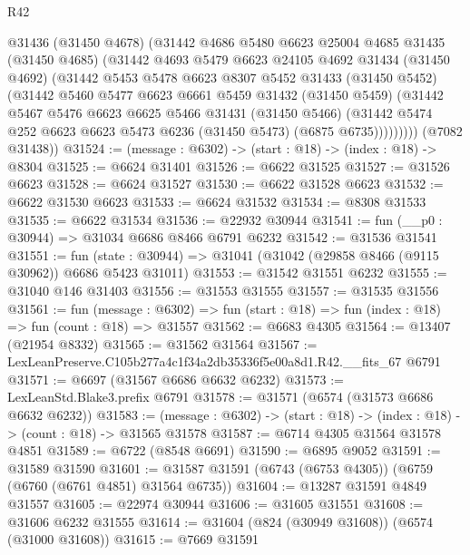 \begin{lexlean}{R42}
\begin{coremodule}
{          @31436
          (@31450 @4678)
          (@31442
            @4686
            @5480
            @6623
            @25004
            @4685
            @31435
            (@31450 @4685)
            (@31442
              @4693
              @5479
              @6623
              @24105
              @4692
              @31434
              (@31450 @4692)
              (@31442
                @5453
                @5478
                @6623
                @8307
                @5452
                @31433
                (@31450 @5452)
                (@31442
                  @5460
                  @5477
                  @6623
                  @6661
                  @5459
                  @31432
                  (@31450 @5459)
                  (@31442
                    @5467
                    @5476
                    @6623
                    @6625
                    @5466
                    @31431
                    (@31450 @5466)
                    (@31442 @5474 @252 @6623 @6623 @5473 @6236 (@31450 @5473) (@6875 @6735)))))))))
      (@7082 @31438))
@31524 := (message : @6302) -> (start : @18) -> (index : @18) -> @8304
@31525 := @6624 @31401
@31526 := @6622 @31525
@31527 := @31526 @6623
@31528 := @6624 @31527
@31530 := @6622 @31528 @6623
@31532 := @6622 @31530 @6623
@31533 := @6624 @31532
@31534 := @8308 @31533
@31535 := @6622 @31534
@31536 := @22932 @30944
@31541 := fun (__p0 : @30944) => @31034 @6686 @8466 @6791 @6232
@31542 := @31536 @31541
@31551 := fun (state : @30944) => @31041 (@31042 (@29858 @8466 (@9115 @30962)) @6686 @5423 @31011)
@31553 := @31542 @31551 @6232
@31555 := @31040 @146 @31403
@31556 := @31553 @31555
@31557 := @31535 @31556
@31561 := fun (message : @6302) =>
  fun (start : @18) => fun (index : @18) => fun (count : @18) => @31557
@31562 := @6683 @4305
@31564 := @13407 (@21954 @8332)
@31565 := @31562 @31564
@31567 := LexLeanPreserve.C105b277a4c1f34a2db35336f5e00a8d1.R42.__fits_67 @6791
@31571 := @6697 (@31567 @6686 @6632 @6232)
@31573 := LexLeanStd.Blake3.prefix @6791
@31578 := @31571 (@6574 (@31573 @6686 @6632 @6232))
@31583 := (message : @6302) -> (start : @18) -> (index : @18) -> (count : @18) -> @31565 @31578
@31587 := @6714 @4305 @31564 @31578 @4851
@31589 := @6722 (@8548 @6691)
@31590 := @6895 @9052
@31591 := @31589 @31590
@31601 := @31587 @31591 (@6743 (@6753 @4305)) (@6759 (@6760 (@6761 @4851) @31564 @6735))
@31604 := @13287 @31591 @4849 @31557
@31605 := @22974 @30944
@31606 := @31605 @31551
@31608 := @31606 @6232 @31555
@31614 := @31604 (@824 (@30949 @31608)) (@6574 (@31000 @31608))
@31615 := @7669 @31591
}
\end{coremodule}
\end{lexlean}
